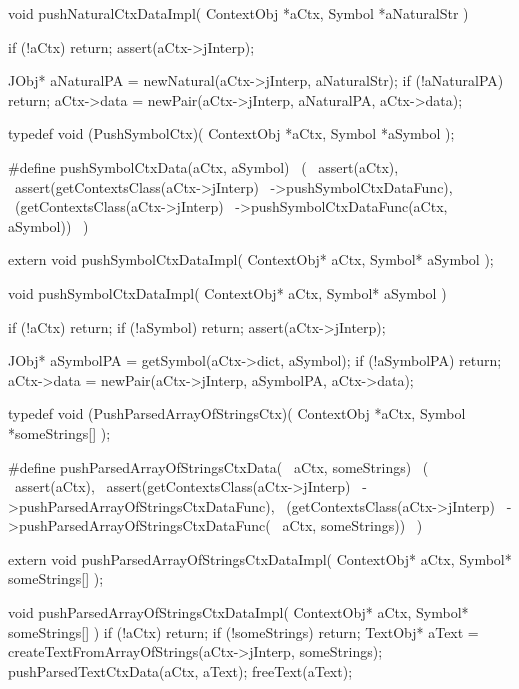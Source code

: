 \startCCode
void pushNaturalCtxDataImpl(
  ContextObj *aCtx,
  Symbol     *aNaturalStr
) {
  if (!aCtx) return;
  assert(aCtx->jInterp);

  JObj* aNaturalPA = newNatural(aCtx->jInterp, aNaturalStr);
  if (!aNaturalPA) return;
  aCtx->data = newPair(aCtx->jInterp, aNaturalPA, aCtx->data);
}
\stopCCode

\startCHeader
typedef void (PushSymbolCtx)(
  ContextObj *aCtx,
  Symbol     *aSymbol
);

#define pushSymbolCtxData(aCtx, aSymbol)      \
  (                                           \
    assert(aCtx),                             \
    assert(getContextsClass(aCtx->jInterp)    \
      ->pushSymbolCtxDataFunc),               \
    (getContextsClass(aCtx->jInterp)          \
      ->pushSymbolCtxDataFunc(aCtx, aSymbol)) \
  )
\stopCHeader

\setCHeaderStream{private}
\startCHeader
extern void pushSymbolCtxDataImpl(
  ContextObj* aCtx,
  Symbol* aSymbol
);
\stopCHeader
\setCHeaderStream{public}

\startCCode
void pushSymbolCtxDataImpl(
  ContextObj* aCtx,
  Symbol* aSymbol
) {
  if (!aCtx) return;
  if (!aSymbol) return;
  assert(aCtx->jInterp);

  JObj* aSymbolPA =
    getSymbol(aCtx->dict, aSymbol);
  if (!aSymbolPA) return;
  aCtx->data = newPair(aCtx->jInterp, aSymbolPA, aCtx->data);
}
\stopCCode

\startCHeader
typedef void (PushParsedArrayOfStringsCtx)(
  ContextObj *aCtx,
  Symbol     *someStrings[]
);

#define pushParsedArrayOfStringsCtxData(      \
  aCtx, someStrings)                          \
  (                                           \
    assert(aCtx),                             \
    assert(getContextsClass(aCtx->jInterp)    \
      ->pushParsedArrayOfStringsCtxDataFunc), \
    (getContextsClass(aCtx->jInterp)          \
      ->pushParsedArrayOfStringsCtxDataFunc(  \
        aCtx, someStrings))                   \
  )
\stopCHeader

\startCHeader
extern void pushParsedArrayOfStringsCtxDataImpl(
  ContextObj* aCtx,
  Symbol* someStrings[]
);
\stopCHeader
\setCHeaderStream{public}

\startCCode
void pushParsedArrayOfStringsCtxDataImpl(
  ContextObj* aCtx,
  Symbol* someStrings[]
) {
  if (!aCtx) return;
  if (!someStrings) return;
  TextObj* aText =
    createTextFromArrayOfStrings(aCtx->jInterp, someStrings);
  pushParsedTextCtxData(aCtx, aText);
  freeText(aText);
}
\stopCCode

